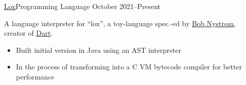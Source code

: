 \documentclass[10pt,a4paper,ragged2e,withhyper]{altacv}
\begin{document}
\begin{paracol}{2}
		\cvevent
		{\href{https://github.com/jaacko-torus/lox}{\uline{Lox}}{\hr}Programming Language}
		{{\CVTagJava}{\CVTagC}}
		{October 2021--Present}{}
		\vspace{-0.3cm}
		\begin{justify}
			A language interpreter for ``lox'', a toy-language spec.-ed by \href{https://github.com/munificent}{\uline{Bob Nystrom}}, creator of \href{https://en.wikipedia.org/wiki/Dart_(programming_language)}{\uline{Dart}}.
		\end{justify}
		\vspace{-0.2cm}
		\smallskip
		\begin{itemize}
			\item Built initial version in Java using an AST interpreter
			\item In the process of transforming into a C VM bytecode compiler for better performance
		\end{itemize}


	\end{paracol}
\end{document}
